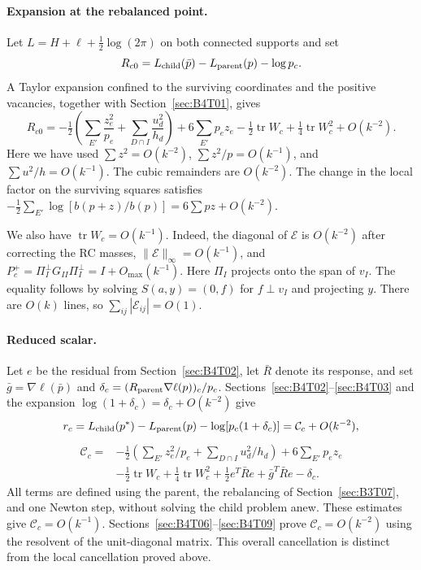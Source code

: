 \paragraph{Expansion at the rebalanced point.}
Let $L=H+\ell+\tfrac12\log(2\pi)$ on both connected supports and set
\[
 R_{c0}=L_{\rm child}(\bar p)-L_{\rm parent}(p)-\log p_c.
\]
A Taylor expansion confined to the surviving coordinates and the positive vacancies, together with
Section~\ref{sec:B4T01}, gives
\[
 \boxed{R_{c0}=-\tfrac12\left(\sum_{E'}\frac{z_e^2}{p_e}
                  +\sum_{D\cap I}\frac{u_d^2}{h_d}\right)
 +6\sum_{E'}p_ez_e-\tfrac12\operatorname{tr}W_c
 +\tfrac14\operatorname{tr}W_c^2+O(k^{-2}).}
\]
Here we have used $\sum z^2=O(k^{-2})$, $\sum z^2/p=O(k^{-1})$, and $\sum u^2/h=O(k^{-1})$. The cubic
remainders are $O(k^{-2})$.
The change in the local factor on the surviving squares satisfies $-\tfrac12\sum_{E'}\log[b(p+z)/b(p)]=6\sum
pz+O(k^{-2})$.

We also have $\operatorname{tr}W_c=O(k^{-1})$. Indeed, the diagonal of $\mathcal E$ is $O(k^{-2})$ after
correcting the RC masses, $\|\mathcal E\|_\infty=O(k^{-1})$, and $P_c^+=\Pi_I^\perp
G_{II}\Pi_I^\perp=I+O_{\max}(k^{-1})$.
Here $\Pi_I$ projects onto the span of $v_I$. The equality follows by solving $S(a,y)=(0,f)$ for $f\perp
v_I$ and projecting $y$.
There are $O(k)$ lines, so $\sum_{ij}|\mathcal E_{ij}|=O(1)$.

\paragraph{Reduced scalar.}
Let $e$ be the residual from Section~\ref{sec:B4T02}, let $\bar R$ denote its response, and set $\bar
g=\nabla\ell(\bar p)$ and $\delta_c=(R_{\rm parent}\nabla\ell(p))_c/p_c$.
Sections~\ref{sec:B4T02}--\ref{sec:B4T03} and the expansion $\log(1+\delta_c)=\delta_c+O(k^{-2})$ give
\begin{equation}\label{eq:rc}
 r_c=L_{\rm child}(p^*)-L_{\rm parent}(p)-\log[p_c(1+\delta_c)]
       =\mathcal C_c+O(k^{-2}),
\end{equation}
\begin{equation}\label{eq:Cc}
 \boxed{\begin{aligned}
 \mathcal C_c={}&-\tfrac12\left(\sum_{E'}z_e^2/p_e+
                                \sum_{D\cap I}u_d^2/h_d\right)
 +6\sum_{E'}p_ez_e\\
 &-\tfrac12\operatorname{tr}W_c+\tfrac14\operatorname{tr}W_c^2
 +\tfrac12e^T\bar R e+\bar g^T\bar R e-\delta_c.
 \end{aligned}}
\end{equation}
All terms are defined using the parent, the rebalancing of Section~\ref{sec:B3T07}, and one Newton step,
without solving the child problem anew. These estimates give $\mathcal C_c=O(k^{-1})$.
Sections~\ref{sec:B4T06}--\ref{sec:B4T09} prove $\mathcal C_c=O(k^{-2})$ using the resolvent of the
unit-diagonal matrix. This overall cancellation is distinct from the local cancellation proved above.

